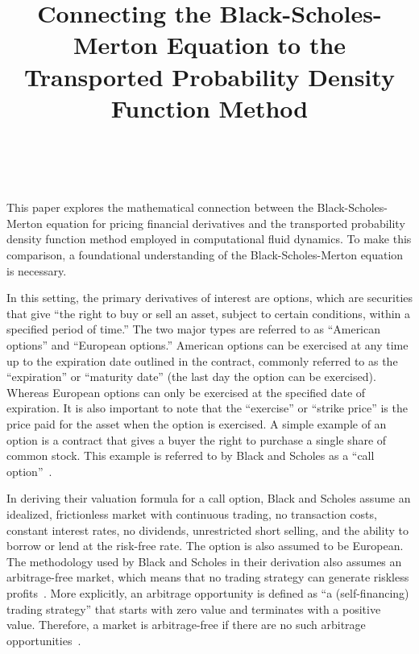 \documentclass[12pt, onecolumn, journal]{IEEEtran}
\begin{document}
\title{\LARGE Connecting the Black-Scholes-Merton Equation to the Transported Probability Density Function Method}

\author{
     \\
}

\maketitle
\vspace{-24pt}

This paper explores the mathematical connection between the Black-Scholes-Merton equation for pricing financial derivatives and the transported probability density function method employed in computational fluid dynamics. To make this comparison, a foundational understanding of the Black-Scholes-Merton equation is necessary.

In this setting, the primary derivatives of interest are options, which are securities that give “the right to buy or sell an asset, subject to certain conditions, within a specified period of time.” The two major types are referred to as “American options” and “European options.” American options can be exercised at any time up to the expiration date outlined in the contract, commonly referred to as the “expiration” or “maturity date” (the last day the option can be exercised). Whereas European options can only be exercised at the specified date of expiration. It is also important to note that the “exercise” or “strike price” is the price paid for the asset when the option is exercised. A simple example of an option is a contract that gives a buyer the right to purchase a single share of common stock. This example is referred to by Black and Scholes as a “call option”~\cite{BlackScholes1973}.

In deriving their valuation formula for a call option, Black and Scholes assume an idealized, frictionless market with continuous trading, no transaction costs, constant interest rates, no dividends, unrestricted short selling, and the ability to borrow or lend at the risk-free rate. The option is also assumed to be European. The methodology used by Black and Scholes in their derivation also assumes an arbitrage-free market, which means that no trading strategy can generate riskless profits~\cite{BlackScholes1973}. More explicitly, an arbitrage opportunity is defined as “a (self-financing) trading strategy” that starts with zero value and terminates with a positive value. Therefore, a market is arbitrage-free if there are no such arbitrage opportunities~\cite{BaxterRennie1996}.
\end{document}
